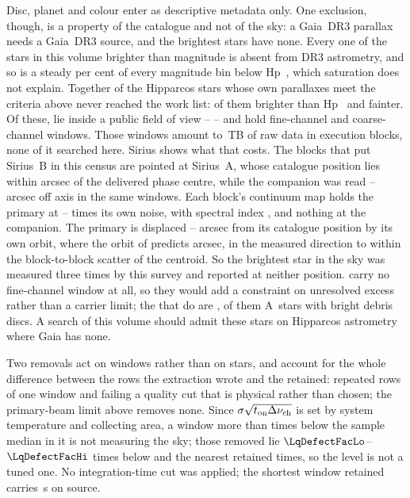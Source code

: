Disc, planet and colour enter as descriptive metadata only. One exclusion,
though, is a property of the catalogue and not of the sky: a Gaia~DR3
parallax needs a Gaia~DR3 source, and the brightest stars have none. Every
one of the \BsNBright{} stars in this volume brighter than \BsBrightMag{}
magnitude is absent from DR3 astrometry, and so is a steady
\BsGapFaintPct{} per cent of every magnitude bin below Hp~\BsGapMagCut,
which saturation does not explain. Together \BsNGap{} of the \BsNVol{} Hipparcos stars whose own parallaxes
meet the criteria above never reached the work list: \BsGapNBright{} of them
brighter than Hp~\BsGapMagCut{} and \BsGapNFaint{} fainter. Of these,
\BsNAlmaWord{} lie inside a public field of view -- \BsStarList{} -- and
hold \BsNWinA{} fine-channel and \BsNWinB{} coarse-channel windows. Those
windows amount to \BsRawTB\,TB of raw data in \BsNEB{} execution blocks,
none of it searched here. Sirius shows what that costs. The \BsSirNEBWord{} blocks that put
Sirius~B in this census are pointed at Sirius~A, whose catalogue position lies
within \BsSirSepA{} arcsec of the delivered phase centre, while the companion
was read \BsSirOffLo--\BsSirOffHi{} arcsec off axis in the same
\BsSirNWin{} windows. Each block's continuum map holds the primary at
\BsSirSnrLo--\BsSirSnrHi{} times its own noise, with spectral index
\BsSirAlpha, and nothing at the companion. The primary is displaced
\BsSirCenLo--\BsSirCenHi{} arcsec from its catalogue position by its own
orbit, where the orbit of \citet{bond2017} predicts \OmSirPredArcsec{}
arcsec, in the measured direction to within the block-to-block scatter of the
centroid. So the brightest star in the sky was measured three times by this
survey and reported at neither position. \BsNoFineList{} carry no fine-channel
window at all, so they would add a constraint on unresolved excess rather
than a carrier limit; the \BsNFineWord{} that do are \BsFineList,
\BsNFineATypeWord{} of them A~stars with bright debris discs. A search of
this volume should admit these stars on Hipparcos astrometry where Gaia has
none.

Two removals act on windows rather than on stars, and account for the whole
difference between the
\LqNExport{} rows the extraction wrote and the \NWindows{} retained:
\NDup{} repeated rows of one window and
\NDefect{} failing a quality cut that is physical rather than chosen; the
primary-beam limit above removes none.
Since $\sigma\sqrt{t_{\rm on}\Delta\nu_{\rm ch}}$ is set by system
temperature and collecting area, a window more than \LqDefectCut{} times
below the sample median in it is not measuring the sky; those removed lie
$\LqDefectFacLo$--$\LqDefectFacHi$ times below and the nearest retained
\LqKeptFac{} times, so the level is not a tuned one. No integration-time cut
was applied; the shortest window retained carries \LqOnsrcMin\,s on source.

